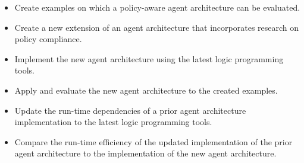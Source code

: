 \begin{itemize}
    \item Create examples on which a policy-aware agent architecture can be evaluated.
    \item Create a new extension of an agent architecture that incorporates research on policy compliance.
    \item Implement the new agent architecture using the latest logic programming tools.
    \item Apply and evaluate the new agent architecture to the created examples.
    \item Update the run-time dependencies of a prior agent architecture implementation to the latest logic programming tools.
    \item Compare the run-time efficiency of the updated implementation of the prior agent architecture to the implementation of the new agent architecture.
\end{itemize}
